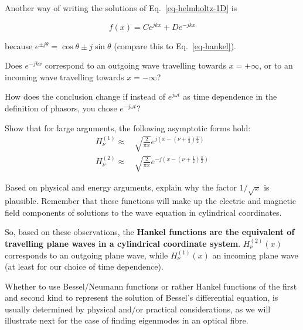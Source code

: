 Another way of writing the solutions of Eq.~\ref{eq-helmholtz-1D} is

\begin{equation}
f(x) = C e^{jkx} + D e^{-jkx}
\end{equation} 

because $e^{\pm j \theta} = \cos \theta \pm j \sin \theta$ (compare this to Eq.~\ref{eq-hankel}).

\pagebreak

\begin{exer}
Does $e^{-jkx}$ correspond to an outgoing wave travelling towards $x=+\infty$, or to an incoming wave travelling towards $x=-\infty$?

How does the conclusion change if instead of  $e^{j \omega t}$ as time dependence in the definition of phasors, you chose $e^{-j \omega t}$?
\end{exer}


\begin{exer}
Show that for large arguments, the following asymptotic forms hold:
\begin{align}
H_{\nu}^{(1)} \approx & \, \sqrt{\frac{2}{\pi x}} e^{j \left( x - \left(\nu + \frac{1}{2}\right)\frac{\pi}{2} \right)} \nonumber \\
  H_{\nu}^{(2)} \approx & \, \sqrt{\frac{2}{\pi x}} e^{-j \left( x - \left(\nu + \frac{1}{2}\right)\frac{\pi}{2} \right)}
\end{align}

Based on physical and energy arguments, explain why the factor $1/\sqrt{x}$ is plausible. Remember that these functions will make up the electric and magnetic field components of solutions to the wave equation in cylindrical coordinates.
                          
\end{exer}

So, based on these observations, the \textbf{Hankel functions are the equivalent of travelling plane waves in a cylindrical coordinate system}.   $H_{\nu}^{(2)}(x)$ corresponds to an outgoing plane wave, while $H_{\nu}^{(1)}(x)$ \is an incoming plane wave (at least for our choice of time dependence).

Whether to use Bessel/Neumann functions or rather Hankel functions of the first and second kind to represent the solution of Bessel's differential equation, is usually determined by physical and/or practical considerations, as we will illustrate next for the case of finding eigenmodes in an optical fibre.


